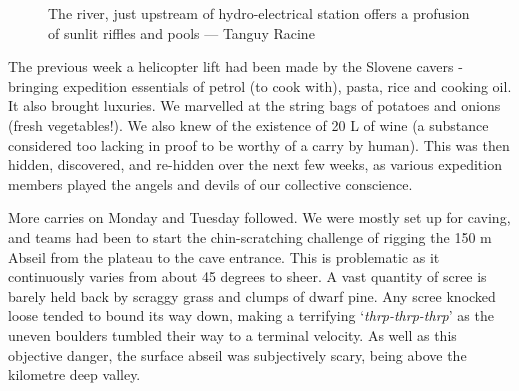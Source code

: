 \begin{figure}[t!]
\begin{subfigure}{0.975\textwidth}
\end{subfigure}
\par\bigskip
\begin{subfigure}{\linewidth}
\end{subfigure}
\caption[Zadla\v{z}cica]{The \protect{} river, just upstream of hydro-electrical station offers a profusion of sunlit riffles and pools --- Tanguy Racine}
\end{figure}


The previous week a helicopter lift had been made by the Slovene cavers - bringing expedition essentials of petrol (to cook with), pasta, rice and cooking oil. It also brought luxuries. We marvelled at the string bags of potatoes and onions (fresh vegetables!). We also knew of the existence of 20 L of wine (a substance considered too lacking in proof to be worthy of a carry by human). This was then hidden, discovered, and re-hidden over the next few weeks, as various expedition members played the angels and devils of our collective conscience. 

More carries on Monday and Tuesday followed. We were mostly set up for caving, and teams had been to start the chin-scratching challenge of rigging the 150 m Abseil from the plateau to the cave entrance. This is problematic as it continuously varies from about 45 degrees to sheer. A vast quantity of scree is barely held back by scraggy grass and clumps of dwarf pine. Any scree knocked loose tended to bound its way down, making a terrifying `\emph{thrp-thrp-thrp}' as the uneven boulders tumbled their way to a terminal velocity. As well as this objective danger, the surface abseil was subjectively scary, being above the kilometre deep  valley. 



